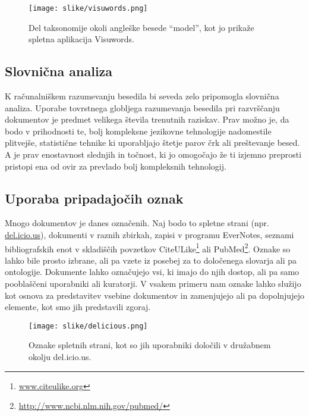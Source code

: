\begin{figure}[htbp]
\begin{center}
\texttt{[image: slike/visuwords.png]}
\caption{Del taksonomije okoli angleške besede ``model'', kot jo
  prikaže spletna aplikacija Visuwords.}
\label{f-visuwords}
\end{center}
\end{figure}


\subsection{Slovnična analiza}

K računalniškem razumevanju besedila bi seveda zelo pripomogla
slovnična analiza. Uporabe tovrstnega globljega razumevanja besedila
pri razvrščanju dokumentov je predmet velikega števila trenutnih
raziskav. Prav možno je, da bodo v prihodnosti te, bolj kompleksne
jezikovne tehnologije nadomestile plitvejše, statistične tehnike ki
uporabljajo štetje parov črk ali preštevanje besed. A je prav
enostavnost slednjih in točnost, ki jo omogočajo že ti izjemno
preprosti pristopi ena od ovir za prevlado bolj kompleksnih
tehnologij.

\subsection{Uporaba pripadajočih oznak}

Mnogo dokumentov je danes označenih. Naj bodo to spletne strani
(npr. \url{del.icio.us}), dokumenti v raznih zbirkah, zapisi v
programu EverNotes, seznami bibliografskih enot v skladiščih povzetkov
CiteULike\footnote{\url{www.citeulike.org}} ali
PubMed\footnote{\url{http://www.ncbi.nlm.nih.gov/pubmed/}}. Oznake so
lahko bile prosto izbrane, ali pa vzete iz posebej za to določenega
slovarja ali pa ontologije. Dokumente lahko označujejo vsi, ki imajo
do njih dostop, ali pa samo pooblaščeni uporabniki ali kuratorji. V
vsakem primeru nam oznake lahko služijo kot osnova za predstavitev
vsebine dokumentov in zamenjujejo ali pa dopolnjujejo elemente, kot
smo jih predstavili zgoraj.

\begin{figure}[htbp]
\begin{center}
\texttt{[image: slike/delicious.png]}
\caption{Oznake spletnih strani, kot so jih uporabniki določili v
  družabnem okolju del.icio.us.}
\label{f-delicious}
\end{center}
\end{figure}


